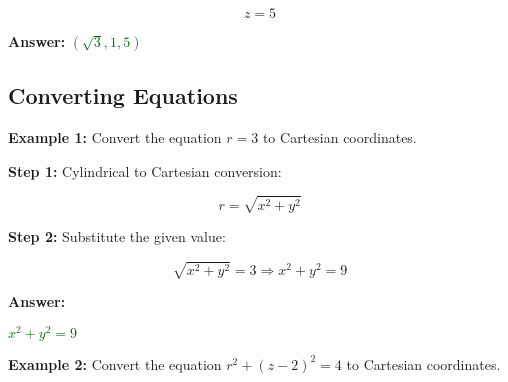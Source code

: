 \documentclass[10pt]{article}                               %
\begin{document}
\begin{adjustwidth}{2em}{0pt}
\begin{adjustwidth}{2em}{0pt}
\begin{examplebox}
\begin{adjustwidth}{2em}{0pt}
                \[ z = 5 \]

                \textbf{Answer:} \textcolor{darkgreen}{\( \left(\sqrt{3}, 1, 5\right) \)}

            \end{adjustwidth}

        \end{examplebox}

        \begin{examplebox}
        
            \subsection*{Converting Equations}
        
            \textbf{Example 1:} Convert the equation \( r = 3 \) to Cartesian coordinates.
            \vspace{0.5em}
        
            \begin{adjustwidth}{2em}{0pt}
        
                \textbf{Step 1:} Cylindrical to Cartesian conversion:
        
                \vspace{0.25em}
        
                \[ r = \sqrt{x^2 + y^2} \]
        
                \vspace{0.5em}
        
                \textbf{Step 2:} Substitute the given value:
        
                \vspace{0.25em}
        
                \[ \sqrt{x^2 + y^2} = 3 \Rightarrow x^2 + y^2 = 9 \]
        
                \vspace{0.5em}
        
                \textbf{Answer:}
        
                \vspace{0.25em}
        
                \textcolor{darkgreen}{\( x^2 + y^2 = 9 \)}
        
            \end{adjustwidth}

            \textbf{Example 2:} Convert the equation \( r^2 + (z - 2)^2 = 4 \) to Cartesian coordinates.
            \vspace{0.5em}
        

\end{examplebox}
\end{adjustwidth}
\end{adjustwidth}
\end{document}
